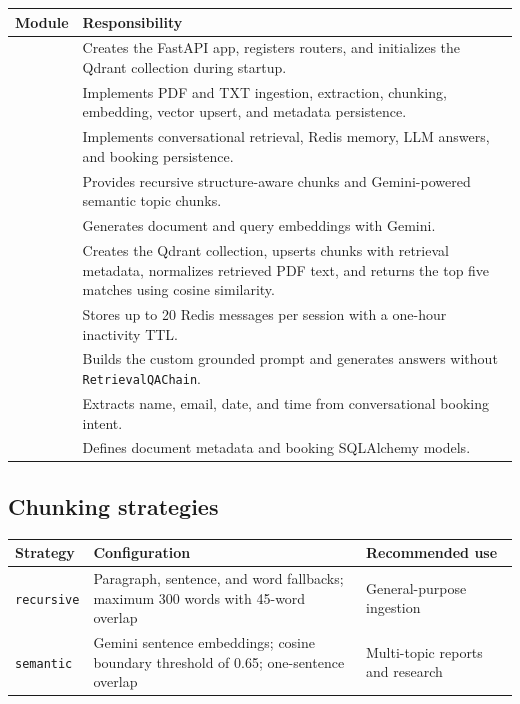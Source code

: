 \documentclass[12pt, a4paper]{article}
\begin{document}
\begin{tabularx}{\textwidth}{L{4.7cm} Y}
    \toprule
    \textbf{Module} & \textbf{Responsibility} \\
    \midrule
     & Creates the FastAPI app, registers routers, and
    initializes the Qdrant collection during startup. \\
     & Implements PDF and TXT ingestion, extraction,
    chunking, embedding, vector upsert, and metadata persistence. \\
     & Implements conversational retrieval, Redis
    memory, LLM answers, and booking persistence. \\
     & Provides recursive structure-aware chunks
    and Gemini-powered semantic topic chunks. \\
     & Generates document and query
    embeddings with Gemini. \\
     & Creates the Qdrant collection,
    upserts chunks with retrieval metadata, normalizes retrieved PDF text, and
    returns the top five matches using cosine similarity. \\
     & Stores up to 20 Redis messages per
    session with a one-hour inactivity TTL. \\
     & Builds the custom grounded prompt and
    generates answers without \texttt{RetrievalQAChain}. \\
     & Extracts name, email, date, and time
    from conversational booking intent. \\
     & Defines document metadata and booking
    SQLAlchemy models. \\
    \bottomrule
\end{tabularx}

\subsection{Chunking strategies}

\begin{tabularx}{\textwidth}{L{2.5cm} L{5cm} Y}
    \toprule
    \textbf{Strategy} & \textbf{Configuration} & \textbf{Recommended use} \\
    \midrule
    \texttt{recursive} & Paragraph, sentence, and word fallbacks; maximum 300
    words with 45-word overlap & General-purpose ingestion \\
    \texttt{semantic} & Gemini sentence embeddings; cosine boundary threshold
    of 0.65; one-sentence overlap & Multi-topic reports and research \\
    \bottomrule
\end{tabularx}
\end{document}
